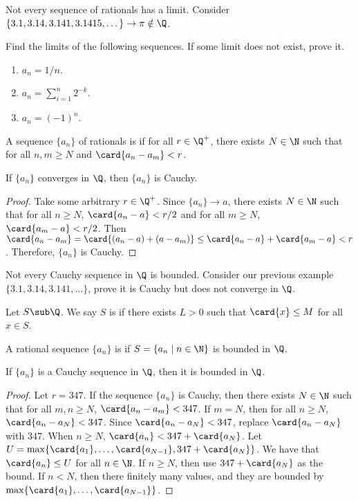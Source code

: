\documentclass[10pt]{article}
\begin{document}
\begin{example}
    Not every sequence of rationals has a limit. Consider $\{3.1,3.14,3.141,3.1415,\dots\}\to\pi\notin\Q$.
\end{example}
\begin{problem}
    Find the limits of the following sequences. If some limit does not exist, prove it.
    \begin{enumerate}
        \item ${a}_{n}=1/n$.
        \item ${a}_{n}={\sum}_{i=1}^{n}{2}^{-k}$.
        \item ${a}_{n}={(-1)}^{n}$.
    \end{enumerate}
\end{problem}
\begin{definition}
    A sequence $\{{a}_{n}\}$ of rationals is  if for all $r\in{\Q}^{+}$, there exists $N\in\N$ such that for all $n,m\ge N$ and $\card{{a}_{n}-{a}_{m}}<r$.
\end{definition}
\begin{proposition}
    If $\{{a}_{n}\}$ converges in $\Q$, then $\{{a}_{n}\}$ is Cauchy.
\end{proposition}
\begin{proof}
    Take some arbitrary $r\in{\Q}^{+}$. Since $\{{a}_{n}\}\to a$, there exists $ N\in\N$ such that for all $n\ge N$, $\card{{a}_{n}-a}<r/2$ and for all $m\ge N$, $\card{{a}_{m}-a}<r/2$. Then $\card{{a}_{n}-{a}_{m}}=\card{({a}_{n}-a)+(a-{a}_{m})}\le\card{{a}_{n}-a}+\card{{a}_{m}-a}<r$. Therefore, $\{{a}_{n}\}$ is Cauchy.
\end{proof}
\begin{problem}
    Not every Cauchy sequence in $\Q$ is bounded. Consider our previous example $\{3.1,3.14,3.141,\dots\}$, prove it is Cauchy but does not converge in $\Q$.
\end{problem}
\begin{definition}
    Let $S\sub\Q$. We say $S$ is  if there exists $L>0$ such that $\card{x}\le M$ for all $x\in S$.
\end{definition}
\begin{definition}
    A rational sequence $\{{a}_{n}\}$ is  if $S=\{{a}_{n}\mid n\in\N\}$ is bounded in $\Q$.
\end{definition}
\begin{proposition}
    If $\{{a}_{n}\}$ is a Cauchy sequence in $\Q$, then it is bounded in $\Q$.
\end{proposition}
\begin{proof}
    Let $r=347$. If the sequence $\{{a}_{n}\}$ is Cauchy, then there exists $N\in\N$ such that for all $m,n\ge N$, $\card{{a}_{n}-{a}_{m}}<347$. If $m=N$, then for all $n\ge N$, $\card{{a}_{n}-{a}_{N}}<347$. Since $\card{{a}_{n}-{a}_{N}}<347$, replace $\card{{a}_{n}-{a}_{N}}$ with $347$. When $n\ge N$, $\card{{a}_{n}}<347+\card{{a}_{N}}$. Let $U=\max\{\card{{a}_{1}},\dots,\card{{a}_{N-1}},347+\card{{a}_{N}}\}$. We have that $\card{{a}_{n}}\le U$ for all $n\in\N$. If $n\ge N$, then use $347+\card{{a}_{N}}$ as the bound. If $n<N$, then there finitely many values, and they are bounded by $\max\{\card{{a}_{1}},\dots,\card{{a}_{N-1}}\}$.
\end{proof}
\end{document}
